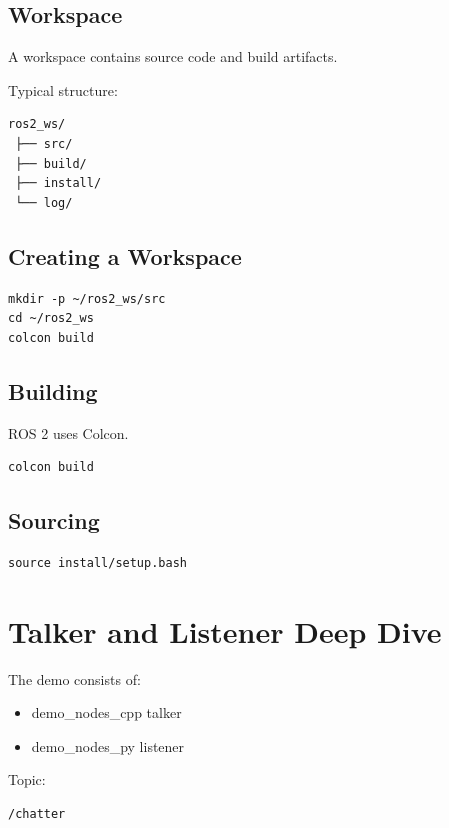 \documentclass[11pt]{article}
\begin{document}
\subsection{Workspace}

A workspace contains source code and build artifacts.

Typical structure:

\begin{verbatim}
ros2_ws/
 ├── src/
 ├── build/
 ├── install/
 └── log/
\end{verbatim}

\subsection{Creating a Workspace}

\begin{verbatim}
mkdir -p ~/ros2_ws/src
cd ~/ros2_ws
colcon build
\end{verbatim}

\subsection{Building}

ROS 2 uses Colcon.

\begin{verbatim}
colcon build
\end{verbatim}

\subsection{Sourcing}

\begin{verbatim}
source install/setup.bash
\end{verbatim}

\section{Talker and Listener Deep Dive}

The demo consists of:

\begin{itemize}
\item demo\_nodes\_cpp talker
\item demo\_nodes\_py listener
\end{itemize}

Topic:

\begin{verbatim}
/chatter
\end{verbatim}
\end{document}
